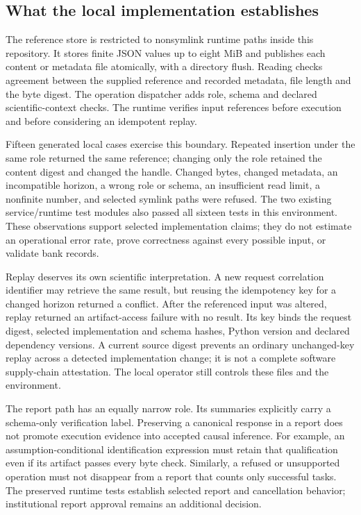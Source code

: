 \hypertarget{what-the-local-implementation-establishes}{%
\subsection{What the local implementation
establishes}\label{what-the-local-implementation-establishes}}

The reference store is restricted to nonsymlink runtime paths inside
this repository. It stores finite JSON values up to eight MiB and
publishes each content or metadata file atomically, with a directory
flush. Reading checks agreement between the supplied reference and
recorded metadata, file length and the byte digest. The operation
dispatcher adds role, schema and declared scientific-context checks. The
runtime verifies input references before execution and before
considering an idempotent replay. \citep{exec14_custody_implementation}

Fifteen generated local cases exercise this boundary. Repeated insertion
under the same role returned the same reference; changing only the role
retained the content digest and changed the handle. Changed bytes,
changed metadata, an incompatible horizon, a wrong role or schema, an
insufficient read limit, a nonfinite number, and selected symlink paths
were refused. The two existing service/runtime test modules also passed
all sixteen tests in this environment. These observations support
selected implementation claims; they do not estimate an operational
error rate, prove correctness against every possible input, or validate
bank records. \citep{exec14_custody_observations}

Replay deserves its own scientific interpretation. A new request
correlation identifier may retrieve the same result, but reusing the
idempotency key for a changed horizon returned a conflict. After the
referenced input was altered, replay returned an artifact-access failure
with no result. Its key binds the request digest, selected
implementation and schema hashes, Python version and declared dependency
versions. A current source digest prevents an ordinary unchanged-key
replay across a detected implementation change; it is not a complete
software supply-chain attestation. The local operator still controls
these files and the environment.
\citep{exec14_custody_implementation,exec14_custody_observations}

The report path has an equally narrow role. Its summaries explicitly
carry a schema-only verification label. Preserving a canonical response
in a report does not promote execution evidence into accepted causal
inference. For example, an assumption-conditional identification
expression must retain that qualification even if its artifact passes
every byte check. Similarly, a refused or unsupported operation must not
disappear from a report that counts only successful tasks. The preserved
runtime tests establish selected report and cancellation behavior;
institutional report approval remains an additional
decision.~\citep{exec14_custody_implementation,exec14_custody_observations}

